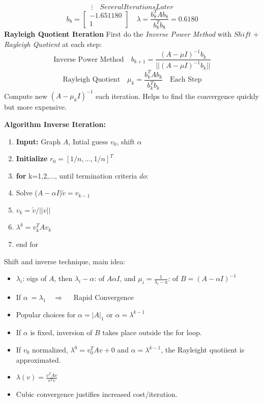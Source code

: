 \documentclass[unicode,11pt,a4paper,oneside,numbers=endperiod,openany]{scrartcl}
\begin{document}
\[
   \vdots \quad Several Iterations Later
\]
\[
 b_8 = \begin{bmatrix}
        -1.651180 \\
        1
       \end{bmatrix}
       \quad
       \lambda = \frac{b_8^TAb_8}{b_8^Tb_8} = 0.6180
\]
\newline
\textbf{Rayleigh Quotient Iteration}\newline
First do the \textit{Inverse Power Method} with $Shift$ + \textit{Rayleigh Quotient} at each step:
\[
 \text{Inverse Power Method}\quad  b_{k+1} = \frac{(A-\mu I)^{-1}b_k}{||(A-\mu I)^{-1}b_k||}
\]
\[
 \text{Rayleigh Quotient} \quad \mu_k = \frac{b^T_kAb_k}{b^T_kb_k} \quad \text{Each Step}
\]
Compute new $(A-\mu_k I)^{-1}$ each iteration.
\newline Helps to find the convergence quickly but more expensive.
\newline\newline




\textbf{Algorithm Inverse Iteration:}
\begin{enumerate}
\item{ \textbf{Input:} Graph $A$, Intial guess $v_0$, shift $\alpha$}
\item{\textbf{Initialize} $r_0 = [1/n,...,1/n]^T$}
\item {\textbf{for} k=1,2,..., until termination criteria $do$:}
\item{\quad Solve ($A-\alpha I$)$\tilde{v} = v_{k-1}$}
\item{\quad $v_k=\tilde{v}/||v||$}
\item{\quad $\lambda^k = v^T_kAv_k$}
\item {end for}
\end{enumerate}
Shift and inverse technique, main idea:
\begin{itemize}
\item{$\lambda_i$: eigs of $A$, then $\lambda_i-\alpha$: of $A \alpha I$, and $\mu_i=\frac{1}{\lambda_i-a}$: of $B=(A-\alpha I)^{-1}$}
\item{If $\alpha ~= \lambda_1 \quad \Rightarrow \quad$ Rapid Convergence}
\item{Popular choices for $\alpha =|A|_1$ or $\alpha = \lambda^{k-1}$}
\item {If $\alpha$ is fixed, inversion of $B$ takes place outside the for loop.}
 \item {If $v_0$ normalized, $\lambda^0=v_0^TAv+0$ and $\alpha=\lambda^{k-1}$, the Rayleight quotiient is approximated.}
 \item{$\lambda(v)=\frac{v^TAv}{v^Tv}$}
 \item{Cubic convergence justifies increased cost/iteration.}
\end{itemize}
\end{document}
